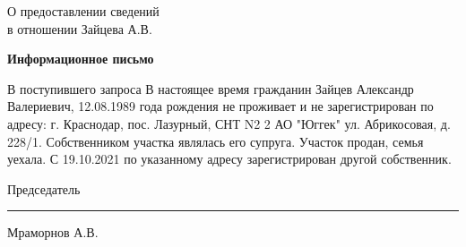 \begin{flushleft}
	\vspace{10mm}
О предоставлении сведений\\
в отношении Зайцева  А.В.
\end{flushleft}
\vspace{7mm}
\begin{center}
	\Large\textbf{Информационное письмо}
\end{center}
\par

В поступившего запроса В настоящее время гражданин Зайцев Александр Валериевич, 12.08.1989 года рождения не проживает и не зарегистрирован по адресу:  г. Краснодар, пос. Лазурный, СНТ N2 2 АО "Юггек" ул. Абрикосовая, д. 228/1.  Собственником участка являлась его супруга. Участок продан, семья уехала. С 19.10.2021   по указанному адресу зарегистрирован другой собственник. 

\vspace{35mm}
Председатель \hfill    \rule{4cm}{0.1 mm}    Мраморнов А.В.




